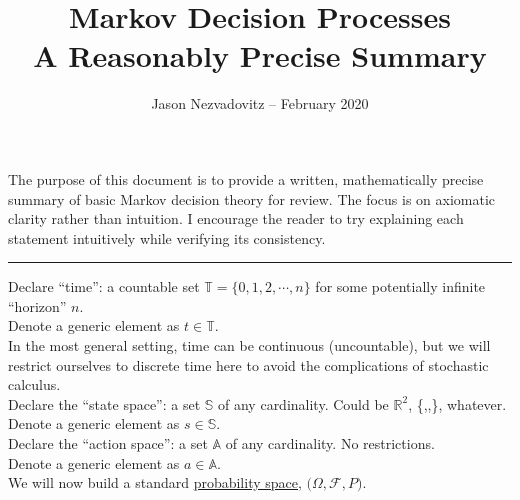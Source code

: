 





\title{\textbf{Markov Decision Processes}\\ \large{A Reasonably Precise Summary}\vspace{-6ex}}
\author{\vspace{-5ex}}
\date{\small{Jason Nezvadovitz -- February 2020}}
\maketitle


The purpose of this document is to provide a written, mathematically precise summary of basic Markov decision theory for review. The focus is on axiomatic clarity rather than intuition. I encourage the reader to try explaining each statement intuitively while verifying its consistency.

\vspace{0.2in}
\hrule
\vspace{0.2in}

Declare ``time'': a countable set $\mathbb{T} = \{0, 1, 2, \cdots, n\}$ for some potentially infinite ``horizon'' $n$.\\
Denote a generic element as $t \in \mathbb{T}$.\\

In the most general setting, time can be continuous (uncountable), but we will restrict ourselves to discrete time here to avoid the complications of stochastic calculus.\\

Declare the ``state space'': a set $\mathbb{S}$ of any cardinality. Could be $\mathbb{R}^2$, \{\Smiley,\Cooley,\Winkey\}, whatever.\\
Denote a generic element as $s \in \mathbb{S}$.\\

Declare the ``action space'': a set $\mathbb{A}$ of any cardinality. No restrictions.\\
Denote a generic element as $a \in \mathbb{A}$.\\

We will now build a standard \href{https://en.wikipedia.org/wiki/Probability_space}{probability space}, $\boldsymbol{(}\Omega, \mathcal{F}, P\boldsymbol{)}$.\\

